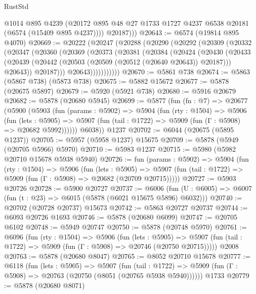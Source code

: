 \begin{lexlean}{RustStd}
\begin{coremodule}
            @1014
            @895
            @4239
            (@20172 @895 @48 @27 @1733 @1727 @4237 @6538 @20181 (@6574 (@15409 @895 @4237))))
          @20187)))
@20643 := @6574 (@19814 @895 @4070)
@20669 := @20222
    (@20247
      (@20288
        (@20290
          (@20292
            (@20309
              (@20332
                (@20347
                  (@20360
                    (@20369
                      (@20373
                        (@20381
                          (@20384
                            (@20424
                              (@20430
                                (@20433
                                  (@20439
                                    (@20442 (@20503 (@20509 (@20512 (@20640 @20643)) @20187)))
                                    @20643))
                                @20187)))
                          @20643)))))))))))
@20670 := @5861 @738
@20674 := @5863 (@5867 @738) (@5873 @738)
@20675 := @5882 @15672
@20677 := @5878 (@20675 @5897)
@20679 := @5920 (@5921 @738)
@20680 := @5916 @20679
@20682 := @5878 (@20680 @5945)
@20699 := @5877
    (fun (fn : @7) =>
    @20677
      (@5900
        (@5903
          (fun (params : @5902) =>
          @5904
            (fun (rty : @1504) =>
            @5906
              (fun (lets : @5905) =>
              @5907 (fun (tail : @1722) => @5909 (fun (Γ : @5908) => @20682 @5992))))))
        @6038))
    @1237
@20702 := @6044 (@20675 (@5895 @1237))
@20705 := @5957 (@5958 @1237) @15675
@20709 := @5878 (@5949 (@20705 @5966) @5970)
@20710 := @5983 @1237
@20715 := @5980 (@5982 @20710 @15678 @5938 @5940)
@20726 := fun (params : @5902) =>
  @5904
    (fun (rty : @1504) =>
    @5906
      (fun (lets : @5905) =>
      @5907 (fun (tail : @1722) => @5909 (fun (Γ : @5908) => @20682 (@20709 @20715)))))
@20727 := @5903 @20726
@20728 := @5900 @20727
@20737 := @6006
    (fun (U : @6005) => @6007 (fun (t : @23) => @6015 (@5878 (@6021 @15675 @5896) @6032)))
@20740 := @20702 (@20728 @20737) @15673
@20742 := @5863 @20727 @20737
@20744 := @6093 @20726 @1693
@20746 := @5878 (@20680 @6099)
@20747 := @20705 @6102
@20748 := @5949 @20747
@20750 := @5878 (@20748 @5970)
@20761 := @6096
    (fun (rty : @1504) =>
    @5906
      (fun (lets : @5905) =>
      @5907 (fun (tail : @1722) => @5909 (fun (Γ : @5908) => @20746 (@20750 @20715)))))
    @2008
@20763 := @5878 (@20680 @8047)
@20765 := @8052 @20710 @15678
@20777 := @6118
    (fun (lets : @5905) =>
    @5907
      (fun (tail : @1722) =>
      @5909 (fun (Γ : @5908) => @20763 (@20750 (@8051 (@20765 @5938 @5940))))))
    @1733
@20779 := @5878 (@20680 @8071)

\end{coremodule}
\end{lexlean}
